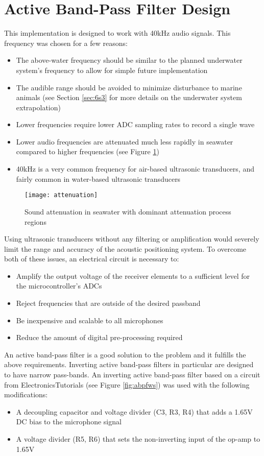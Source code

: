 \documentclass[11pt]{ucthesisCP}
\begin{document}
\section{Active Band-Pass Filter Design} \label{sec:3s4}
This implementation is designed to work with 40kHz audio signals. This frequency was chosen for a few reasons:
\begin{itemize}[noitemsep,topsep=0pt,]
	\item The above-water frequency should be similar to the planned underwater system’s frequency to allow for simple future implementation
	\item The audible range should be avoided to minimize disturbance to marine animals (see Section \ref{sec:6s3} for more details on the underwater system extrapolation)
	\item Lower frequencies require lower ADC sampling rates to record a single wave
	\item Lower audio frequencies are attenuated much less rapidly in seawater compared to higher frequencies (see Figure \ref{fig:attenuation})
	\item 40kHz is a very common frequency for air-based ultrasonic transducers, and fairly common in water-based ultrasonic transducers
\end{itemize}

\begin{figure}[htbp]
	\centering
	\texttt{[image: attenuation]}
	\caption{Sound attenuation in seawater with dominant attenuation process regions \cite{computational}}
	\label{fig:attenuation}
\end{figure}

Using ultrasonic transducers without any filtering or amplification would severely limit the range and accuracy of the acoustic positioning system. To overcome both of these issues, an electrical circuit is necessary to:
\begin{itemize}[noitemsep,topsep=0pt,]
	\item Amplify the output voltage of the receiver elements to a sufficient level for the microcontroller’s ADCs
	\item Reject frequencies that are outside of the desired passband
	\item Be inexpensive and scalable to all microphones
	\item Reduce the amount of digital pre-processing required
\end{itemize}

An active band-pass filter is a good solution to the problem and it fulfills the above requirements. Inverting active band-pass filters in particular are designed to have narrow pass-bands. An inverting active band-pass filter based on a circuit from ElectronicsTutorials \cite{abpfws} (see Figure \ref{fig:abpfws}) was used with the following modifications:
\begin{itemize}[noitemsep,topsep=0pt,]
	\item A decoupling capacitor and voltage divider (C3, R3, R4) that adds a 1.65V DC bias to the microphone signal
	\item A voltage divider (R5, R6) that sets the non-inverting input of the op-amp to 1.65V
\end{itemize}
\end{document}
